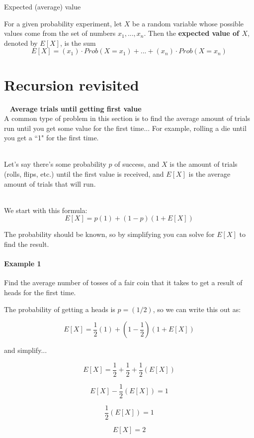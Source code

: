 \documentclass[a4paper,12pt]{book}
\begin{document}
        \begin{intro}{Expected (average) value}

            For a given probability experiment, let $X$ be a random
            variable whose possible values come from the set of numbers
            $ x_{1}, ..., x_{n} $. Then the \textbf{expected value of $X$},
            denoted by $E[X]$, is the sum
            $$ E[X] = (x_{1}) \cdot Prob(X = x_{1}) + ... + (x_{n}) \cdot Prob(X = x_{n}) $$

        \end{intro}

        \newpage


    \section{Recursion revisited}

        \begin{intro}{\ }
            \textbf{Average trials until getting first value} \\
            A common type of problem in this section is to find the
            average amount of trials run until you get some value for
            the first time... For example, rolling a die until you
            get a ``1" for the first time.

            ~\\
            Let's say there's some probability $p$ of success, and $X$
            is the amount of trials (rolls, flips, etc.) until the first
            value is received, and $E[X]$ is the average amount of
            trials that will run.

            ~\\
            We start with this formula:
            $$ E[X] = p(1) + (1 - p)(1 + E[X]) $$

            The probability should be known, so by simplifying you
            can solve for $E[X]$ to find the result.

            \paragraph{Example 1}
                Find the average number of tosses of a fair coin that it takes
                to get a result of heads for the first time.

                The probability of getting a heads is $p = (1/2)$, so we
                can write this out as:

                $$ E[X] = \frac{1}{2}(1) + (1 - \frac{1}{2})(1 + E[X]) $$

                and simplify...

                $$ E[X] = \frac{1}{2} + \frac{1}{2} + \frac{1}{2}(E[X]) $$

                $$ E[X] - \frac{1}{2}(E[X]) = 1 $$

                $$ \frac{1}{2}(E[X]) = 1 $$

                $$ E[X] = 2 $$
        \end{intro}
\end{document}
